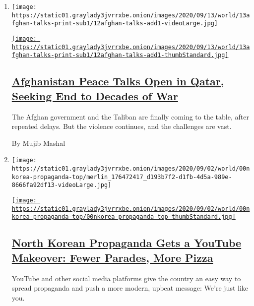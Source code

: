 \begin{enumerate}
\def\labelenumi{\arabic{enumi}.}
\item
  \texttt{[image: https://static01.graylady3jvrrxbe.onion/images/2020/09/13/world/13afghan-talks-print-sub1/12afghan-talks-add1-videoLarge.jpg]}

  \href{/2020/09/12/world/asia/afghanistan-taliban.html}{\texttt{[image: https://static01.graylady3jvrrxbe.onion/images/2020/09/13/world/13afghan-talks-print-sub1/12afghan-talks-add1-thumbStandard.jpg]}}

  \hypertarget{afghanistan-peace-talks-open-in-qatar-seeking-end-to-decades-of-war}{%
  \subsection{\texorpdfstring{\href{/2020/09/12/world/asia/afghanistan-taliban.html}{Afghanistan
  Peace Talks Open in Qatar, Seeking End to Decades of
  War}}{Afghanistan Peace Talks Open in Qatar, Seeking End to Decades of War}}\label{afghanistan-peace-talks-open-in-qatar-seeking-end-to-decades-of-war}}

  The Afghan government and the Taliban are finally coming to the table,
  after repeated delays. But the violence continues, and the challenges
  are vast.

  By Mujib Mashal
\item
  \texttt{[image: https://static01.graylady3jvrrxbe.onion/images/2020/09/02/world/00nkorea-propaganda-top/merlin\_176472417\_d193b7f2-d1fb-4d5a-989e-8666fa92df13-videoLarge.jpg]}

  \href{/2020/09/12/world/asia/north-korea-kim-jong-un-propaganda.html}{\texttt{[image: https://static01.graylady3jvrrxbe.onion/images/2020/09/02/world/00nkorea-propaganda-top/00nkorea-propaganda-top-thumbStandard.jpg]}}

  \hypertarget{north-korean-propaganda-gets-a-youtube-makeover-fewer-parades-more-pizza}{%
  \subsection{\texorpdfstring{\href{/2020/09/12/world/asia/north-korea-kim-jong-un-propaganda.html}{North
  Korean Propaganda Gets a YouTube Makeover: Fewer Parades, More
  Pizza}}{North Korean Propaganda Gets a YouTube Makeover: Fewer Parades, More Pizza}}\label{north-korean-propaganda-gets-a-youtube-makeover-fewer-parades-more-pizza}}

  YouTube and other social media platforms give the country an easy way
  to spread propaganda and push a more modern, upbeat message: We're
  just like you.


\end{enumerate}
